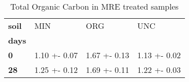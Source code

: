 \begin{table}
\centering
\caption{Total Organic Carbon in MRE treated samples}
\label{<built-in method lower of str object at 0x7f389ecd0928>_treated_main}
\begin{tabular}{llll}
\toprule
\textbf{soil} &           MIN &           ORG &           UNC \\
\textbf{days} &               &               &               \\
\midrule
\textbf{0   } &  1.10 +- 0.07 &  1.67 +- 0.13 &  1.13 +- 0.02 \\
\textbf{28  } &  1.25 +- 0.12 &  1.69 +- 0.11 &  1.22 +- 0.03 \\
\bottomrule
\end{tabular}
\end{table}
